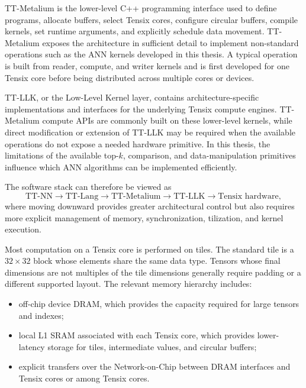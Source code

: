 TT-Metalium is the lower-level C++ programming interface used to define programs, allocate buffers, select Tensix cores, configure circular buffers, compile kernels, set runtime arguments, and explicitly schedule data movement. TT-Metalium exposes the architecture in sufficient detail to implement non-standard operations such as the ANN kernels developed in this thesis. A typical operation is built from reader, compute, and writer kernels and is first developed for one Tensix core before being distributed across multiple cores or devices.

TT-LLK, or the Low-Level Kernel layer, contains architecture-specific implementations and interfaces for the underlying Tensix compute engines. TT-Metalium compute APIs are commonly built on these lower-level kernels, while direct modification or extension of TT-LLK may be required when the available operations do not expose a needed hardware primitive. In this thesis, the limitations of the available top-\(k\), comparison, and data-manipulation primitives influence which ANN algorithms can be implemented efficiently.

The software stack can therefore be viewed as
\begin{equation}
\text{TT-NN}\rightarrow\text{TT-Lang}\rightarrow\text{TT-Metalium}\rightarrow\text{TT-LLK}\rightarrow\text{Tensix hardware},
\end{equation}
where moving downward provides greater architectural control but also requires more explicit management of memory, synchronization, tilization, and kernel execution.

Most computation on a Tensix core is performed on tiles. The standard tile is a \(32\times32\) block whose elements share the same data type. Tensors whose final dimensions are not multiples of the tile dimensions generally require padding or a different supported layout.
\newline
The relevant memory hierarchy includes:
\begin{itemize}
\item off-chip device DRAM, which provides the capacity required for large tensors and indexes;
\item local L1 SRAM associated with each Tensix core, which provides lower-latency storage for tiles, intermediate values, and circular buffers;
\item explicit transfers over the Network-on-Chip between DRAM interfaces and Tensix cores or among Tensix cores.
\end{itemize}

